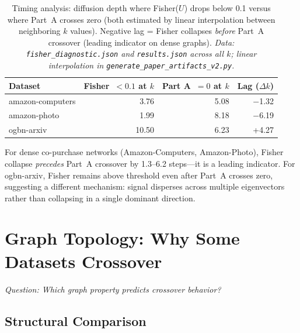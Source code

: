 \documentclass[11pt]{article}
\begin{document}
\begin{table}[H]
\centering
\caption{Timing analysis: diffusion depth where Fisher($U$) drops below 0.1 versus
where Part~A crosses zero (both estimated by linear interpolation between neighboring $k$
values).  Negative lag = Fisher collapses \emph{before} Part~A crossover (leading indicator
on dense graphs).
\textit{\scriptsize Data: \texttt{fisher\_diagnostic.json} and \texttt{results.json} across
all $k$; linear interpolation in \texttt{generate\_paper\_artifacts\_v2.py}.}}
\label{tab:fisher_timing}
\begin{tabular}{lrrr}
\toprule
Dataset & Fisher~$<0.1$ at $k$ & Part A~$=0$ at $k$ & Lag ($\Delta k$) \\
\midrule
amazon-computers & 3.76  & 5.08 & $-$1.32 \\
amazon-photo     & 1.99  & 8.18 & $-$6.19 \\
ogbn-arxiv       & 10.50 & 6.23 & +4.27 \\
\bottomrule
\end{tabular}
\end{table}

For dense co-purchase networks (Amazon-Computers, Amazon-Photo), Fisher collapse
\emph{precedes} Part~A crossover by 1.3--6.2 steps---it is a leading indicator.
For ogbn-arxiv, Fisher remains above threshold even after Part~A crosses zero,
suggesting a different mechanism: signal disperses across multiple eigenvectors rather
than collapsing in a single dominant direction.

\section{Graph Topology: Why Some Datasets Crossover}
\textit{Question: Which graph property predicts crossover behavior?}
\label{sec:topology}

\subsection{Structural Comparison}
\end{document}

